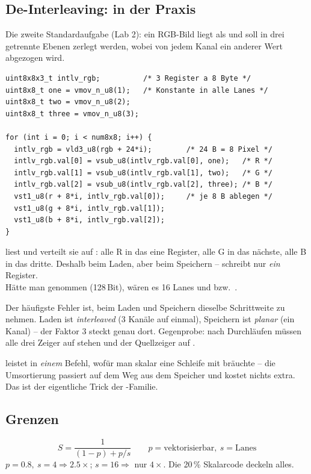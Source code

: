 \subsection{De-Interleaving:  in der Praxis}
\label{bsp:vld3}
Die zweite Standardaufgabe (Lab 2): ein RGB-Bild liegt
 als  und soll in drei getrennte
Ebenen zerlegt werden, wobei von jedem Kanal ein anderer Wert abgezogen
wird.
\begin{lstlisting}
uint8x8x3_t intlv_rgb;          /* 3 Register a 8 Byte */
uint8x8_t one = vmov_n_u8(1);   /* Konstante in alle Lanes */
uint8x8_t two = vmov_n_u8(2);
uint8x8_t three = vmov_n_u8(3);

for (int i = 0; i < num8x8; i++) {
  intlv_rgb = vld3_u8(rgb + 24*i);        /* 24 B = 8 Pixel */
  intlv_rgb.val[0] = vsub_u8(intlv_rgb.val[0], one);   /* R */
  intlv_rgb.val[1] = vsub_u8(intlv_rgb.val[1], two);   /* G */
  intlv_rgb.val[2] = vsub_u8(intlv_rgb.val[2], three); /* B */
  vst1_u8(r + 8*i, intlv_rgb.val[0]);     /* je 8 B ablegen */
  vst1_u8(g + 8*i, intlv_rgb.val[1]);
  vst1_u8(b + 8*i, intlv_rgb.val[2]);
}
\end{lstlisting}
\begin{formel}
 liest  und
verteilt sie auf : alle R in das eine Register, alle G in
das nächste, alle B in das dritte. Deshalb  beim Laden,
aber  beim Speichern --  schreibt nur \emph{ein}
Register.\\[2pt]
Hätte man  genommen (128\,Bit), wären es 16 Lanes und
 bzw.\ .
\end{formel}
\begin{falle}
Der häufigste Fehler ist, beim Laden und Speichern dieselbe Schrittweite
zu nehmen. Laden ist \emph{interleaved} (3 Kanäle auf einmal),
Speichern ist \emph{planar} (ein Kanal) -- der Faktor 3 steckt genau
dort. Gegenprobe: nach  Durchläufen müssen alle drei Zeiger
auf  stehen und der Quellzeiger auf .
\end{falle}
\merkzeile {} leistet in \emph{einem} Befehl, wofür man skalar
eine Schleife mit  bräuchte -- die Umsortierung passiert
auf dem Weg aus dem Speicher und kostet nichts extra. Das ist der
eigentliche Trick der -Familie.

\subsection{Grenzen}
\label{sec:simdgrenzen}
\begin{formel}
\label{form:amdahl}
\[S=\frac{1}{(1-p)+p/s}\qquad p=\text{vektorisierbar},\ s=\text{Lanes}\]
$p{=}0.8,\ s{=}4\Rightarrow2.5\times$; $s{=}16\Rightarrow$ nur $4\times$.
Die 20\,\% Skalarcode deckeln alles.
\end{formel}

